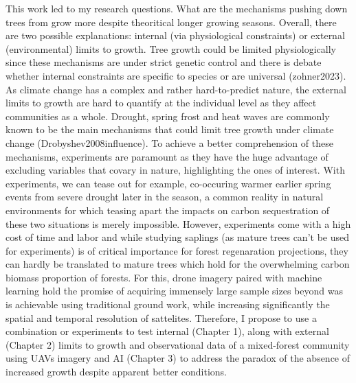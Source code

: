 \documentclass{article}
\begin{document}
This work led to my research questions. What are the mechanisms pushing down trees from grow more despite theoritical longer growing seasons. Overall, there are two possible explanations: internal (via physiological constraints) or external (environmental) limits to growth. Tree growth could be limited physiologically since these mechanisms are under strict genetic control and there is debate whether internal constraints are specific to species or are universal (zohner2023). As climate change has a complex and rather hard-to-predict nature, the external limits to growth are hard to quantify at the individual level as they affect communities as a whole. Drought, spring frost and heat waves are commonly known to be the main mechanisms that could limit tree growth under climate change (Drobyshev2008influence). To achieve a better comprehension of these mechanisms, experiments are paramount as they have the huge advantage of excluding variables that covary in nature, highlighting the ones of interest. With experiments, we can tease out for example, co-occuring warmer earlier spring events from severe drought later in the season, a common reality in natural environments for which teasing apart the impacts on carbon sequestration of these two situations is merely impossible. However, experiments come with a high cost of time and labor and while studying saplings (as mature trees can't be used for experiments) is of critical importance for forest regenaration projections, they can hardly be translated to mature trees which hold for the overwhelming carbon biomass proportion of forests. For this, drone imagery paired with machine learning hold the promise of acquiring immensely large sample sizes beyond was is achievable using traditional ground work, while increasing significantly the spatial and temporal resolution of sattelites. Therefore, I propose to use a combination or experiments to test internal (Chapter 1), along with external (Chapter 2) limits to growth and observational data of a mixed-forest community using UAVs imagery and AI (Chapter 3) to address the paradox of the absence of increased growth despite apparent better conditions.   

\end{document}
